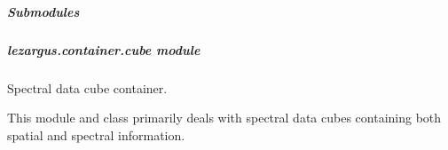 \documentclass[letterpaper,11pt,english]{sphinxmanual}
\begin{document}
\subparagraph{Submodules}
\label{\detokenize{code/lezargus.container:submodules}}
\sphinxstepscope


\subparagraph{lezargus.container.cube module}
\label{\detokenize{code/lezargus.container.cube:module-lezargus.container.cube}}\label{\detokenize{code/lezargus.container.cube:lezargus-container-cube-module}}\label{\detokenize{code/lezargus.container.cube::doc}}
\sphinxAtStartPar
Spectral data cube container.

\sphinxAtStartPar
This module and class primarily deals with spectral data cubes containing both
spatial and spectral information.
\end{document}
